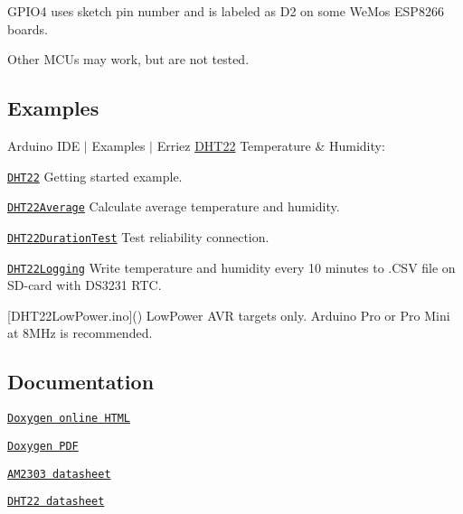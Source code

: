 \begin{DoxyItemize}
\item {\ttfamily G\+P\+I\+O4} uses sketch pin number {} and is labeled as {\ttfamily D2} on some We\+Mos E\+S\+P8266 boards.
\item Other M\+CU\textquotesingle{}s may work, but are not tested.
\end{DoxyItemize}

\subsection*{Examples}

Arduino I\+DE $\vert$ Examples $\vert$ Erriez \hyperlink{class_d_h_t22}{D\+H\+T22} Temperature \& Humidity\+:


\begin{DoxyItemize}
\item \href{https://github.com/Erriez/ErriezDHT22/blob/master/examples/DHT22/DHT22.ino}{\tt D\+H\+T22} Getting started example.
\item \href{https://github.com/Erriez/ErriezDHT22/blob/master/examples/DHT22Average/DHT22Average.ino}{\tt D\+H\+T22\+Average} Calculate average temperature and humidity.
\item \href{https://github.com/Erriez/ErriezDHT22/blob/master/examples/DHT22DurationTest/DHT22DurationTest.ino}{\tt D\+H\+T22\+Duration\+Test} Test reliability connection.
\item \href{https://github.com/Erriez/ErriezDHT22/blob/master/examples/DHT22Logging/DHT22Logging.ino}{\tt D\+H\+T22\+Logging} Write temperature and humidity every 10 minutes to .C\+SV file on S\+D-\/card with D\+S3231 R\+TC.
\item \mbox{[}D\+H\+T22\+Low\+Power.\+ino\mbox{]}() Low\+Power A\+VR targets only. Arduino Pro or Pro Mini at 8\+M\+Hz is recommended.
\end{DoxyItemize}

\subsection*{Documentation}


\begin{DoxyItemize}
\item \href{https://erriez.github.io/ErriezDHT22}{\tt Doxygen online H\+T\+ML}
\item \href{https://github.com/Erriez/ErriezDHT22/raw/gh-pages/latex/ErriezDHT22.pdf}{\tt Doxygen P\+DF}
\item \href{https://raw.githubusercontent.com/Erriez/ErriezDHT22/master/extras/AM2303_datasheet.pdf}{\tt A\+M2303 datasheet}
\item \href{https://www.google.com/search?q=DHT22+datasheet}{\tt D\+H\+T22 datasheet}
\end{DoxyItemize}

